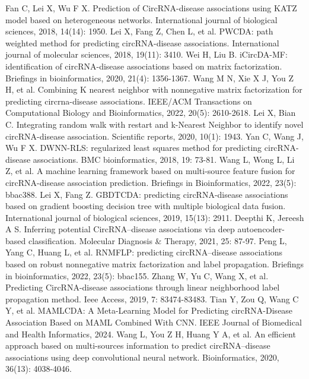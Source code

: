 \documentclass{bioinfo}
\begin{document}
\begin{thebibliography}{}
Fan C, Lei X, Wu F X. Prediction of CircRNA-disease associations using KATZ model based on heterogeneous networks. International journal of biological sciences, 2018, 14(14): 1950.
Lei X, Fang Z, Chen L, et al. PWCDA: path weighted method for predicting circRNA-disease associations. International journal of molecular sciences, 2018, 19(11): 3410.
Wei H, Liu B. iCircDA-MF: identification of circRNA-disease associations based on matrix factorization. Briefings in bioinformatics, 2020, 21(4): 1356-1367.
Wang M N, Xie X J, You Z H, et al. Combining K nearest neighbor with nonnegative matrix factorization for predicting circrna-disease associations. IEEE/ACM Transactions on Computational Biology and Bioinformatics, 2022, 20(5): 2610-2618.
%
Lei X, Bian C. Integrating random walk with restart and k-Nearest Neighbor to identify novel circRNA-disease association. Scientific reports, 2020, 10(1): 1943.
Yan C, Wang J, Wu F X. DWNN-RLS: regularized least squares method for predicting circRNA-disease associations. BMC bioinformatics, 2018, 19: 73-81.
Wang L, Wong L, Li Z, et al. A machine learning framework based on multi-source feature fusion for circRNA-disease association prediction. Briefings in Bioinformatics, 2022, 23(5): bbac388.
Lei X, Fang Z. GBDTCDA: predicting circRNA-disease associations based on gradient boosting decision tree with multiple biological data fusion. International journal of biological sciences, 2019, 15(13): 2911.
%
Deepthi K, Jereesh A S. Inferring potential CircRNA–disease associations via deep autoencoder-based classification. Molecular Diagnosis \& Therapy, 2021, 25: 87-97.
Peng L, Yang C, Huang L, et al. RNMFLP: predicting circRNA–disease associations based on robust nonnegative matrix factorization and label propagation. Briefings in bioinformatics, 2022, 23(5): bbac155.
%
Zhang W, Yu C, Wang X, et al. Predicting CircRNA-disease associations through linear neighborhood label propagation method. Ieee Access, 2019, 7: 83474-83483.
%
Tian Y, Zou Q, Wang C Y, et al. MAMLCDA: A Meta-Learning Model for Predicting circRNA-Disease Association Based on MAML Combined With CNN. IEEE Journal of Biomedical and Health Informatics, 2024.
%
Wang L, You Z H, Huang Y A, et al. An efficient approach based on multi-sources information to predict circRNA–disease associations using deep convolutional neural network. Bioinformatics, 2020, 36(13): 4038-4046.

\end{thebibliography}
\end{document}
